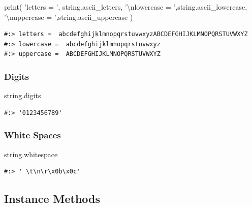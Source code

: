 \documentclass[
]{book}
\newenvironment{Shaded}{\begin{snugshade}}{\end{snugshade}}
\newcommand{\BuiltInTok}[1]{#1}
\newcommand{\CharTok}[1]{\textcolor[rgb]{0.5,0.5,0.5}{#1}}
\newcommand{\NormalTok}[1]{#1}
\newcommand{\StringTok}[1]{\textcolor[rgb]{0.5,0.5,0.5}{#1}}
\begin{document}
\begin{Shaded}
\begin{Highlighting}[]
\BuiltInTok{print}\NormalTok{( }\StringTok{'letters = '}\NormalTok{, string.ascii_letters,}
        \StringTok{'}\CharTok{\textbackslash{}n}\StringTok{lowercase = '}\NormalTok{,string.ascii_lowercase,}
        \StringTok{'}\CharTok{\textbackslash{}n}\StringTok{uppercase = '}\NormalTok{,string.ascii_uppercase )}
\end{Highlighting}
\end{Shaded}

\begin{verbatim}
#:> letters =  abcdefghijklmnopqrstuvwxyzABCDEFGHIJKLMNOPQRSTUVWXYZ 
#:> lowercase =  abcdefghijklmnopqrstuvwxyz 
#:> uppercase =  ABCDEFGHIJKLMNOPQRSTUVWXYZ
\end{verbatim}

\hypertarget{digits}{%
\subsubsection{Digits}\label{digits}}

\begin{Shaded}
\begin{Highlighting}[]
\NormalTok{string.digits}
\end{Highlighting}
\end{Shaded}

\begin{verbatim}
#:> '0123456789'
\end{verbatim}

\hypertarget{white-spaces}{%
\subsubsection{White Spaces}\label{white-spaces}}

\begin{Shaded}
\begin{Highlighting}[]
\NormalTok{string.whitespace}
\end{Highlighting}
\end{Shaded}

\begin{verbatim}
#:> ' \t\n\r\x0b\x0c'
\end{verbatim}

\hypertarget{instance-methods}{%
\subsection{Instance Methods}\label{instance-methods}}
\end{document}
